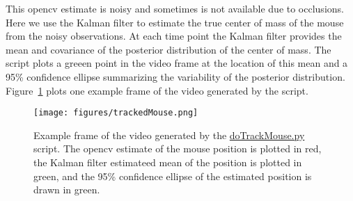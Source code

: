 \documentclass[12pt]{article}
\begin{document}
This opencv estimate is noisy and sometimes is not available due to occlusions.
Here we use the Kalman filter to estimate the true center of mass of the mouse
from the noisy observations. At each time point the Kalman filter provides the
mean and covariance of the posterior distribution of the center of mass. The
script plots a greeen point in the video frame at the location of this mean and
a 95\% confidence ellipse summarizing the variability of the posterior
distribution. Figure~\ref{fig:trackedMouse} plots one example frame of the
video generated by the script.

\begin{figure}
	\begin{center}
		\texttt{[image: figures/trackedMouse.png]}
		\label{fig:trackedMouse}

        \caption{Example frame of the video generated by the
        \href{https://github.com/joacorapela/neuroinformatics24/blob/master/worksheets/07_linearDynamicalSystems/code/scripts/doTrackMouse.py}{doTrackMouse.py}
        script. The opencv estimate of the mouse position is plotted in red,
        the Kalman filter estimateed mean of the position is plotted in green,
        and the 95\% confidence ellipse of the estimated position is drawn in
        green.}

	\end{center}
\end{figure}




\end{document}
